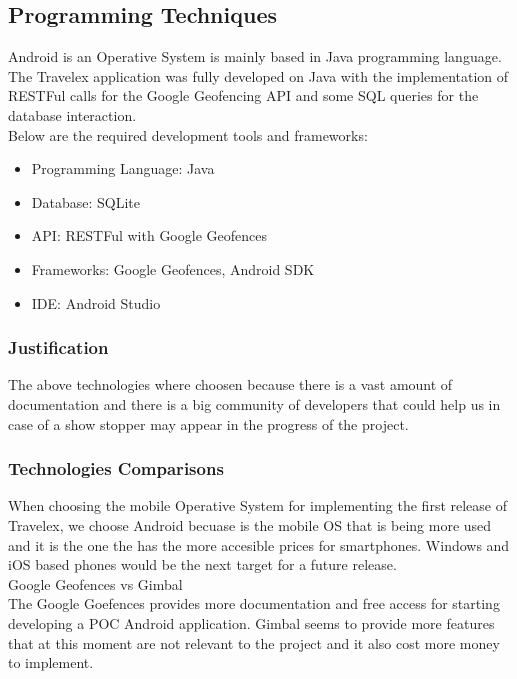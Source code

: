 \subsection{Programming Techniques}
Android is an Operative System is mainly based in Java programming language. The Travelex application was fully developed
on Java with the implementation of RESTFul calls for the Google Geofencing API and some SQL queries for the database
interaction. \\

Below are the required development tools and frameworks:

\begin{itemize}
  \item Programming Language: Java
  \item Database: SQLite
  \item API: RESTFul with Google Geofences
  \item Frameworks: Google Geofences, Android SDK
  \item IDE: Android Studio
\end{itemize}

\subsubsection{Justification}
The above technologies where choosen because there is a vast amount of 
documentation and there is a big community of developers that could help
us in case of a show stopper may appear in the progress of the project.

\subsubsection{Technologies Comparisons}
When choosing the mobile Operative System for implementing the first release
of Travelex, we choose Android becuase is the mobile OS that is being more 
used and it is the one the has the more accesible prices for smartphones.
Windows and iOS based phones would be the next target for a future release. \\

Google Geofences vs Gimbal \\
The Google Goefences provides more documentation and free access for starting
developing a POC Android application. Gimbal seems to provide more features 
that at this moment are not relevant to the project and it also cost more 
money to implement.
